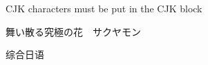 \documentclass{article}
\begin{document}
CJK characters must be put in the CJK block

\begin{CJK}{UTF8}{min}舞い散る究極の花　サクヤモン\end{CJK}
\begin{CJK}{UTF8}{gbsn}综合日语\end{CJK}
\end{document}
